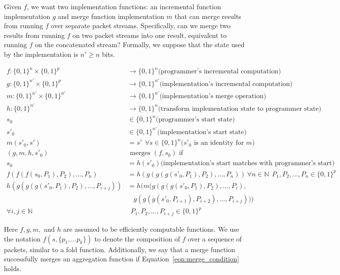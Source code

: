 Given $f$, we want two implementation functions: an incremental function implementation $g$
 and merge function implementation $m$ that can merge results from
running $f$ over separate packet streams. Specifically, can we merge
two results from running $f$ on two packet streams into one result,
equivalent to running $f$ on the concatenated stream? Formally, we suppose that the state used by
the implementation is $n' \geq n$ bits.

\begin{align}
f : \{0, 1\}^n \times \{0, 1\}^p & \rightarrow \{0, 1\}^n \mbox{(programmer's incremental computation)} \nonumber \\
g : \{0, 1\}^{n'} \times \{0, 1\}^p  & \rightarrow \{0, 1\}^{n'} \mbox{(implementation's incremental computation)} \nonumber \\
m : \{0, 1\}^{n'} \times \{0, 1\}^{n'} & \rightarrow \{0, 1\}^{n'} \mbox{(implementation's merge operation)} \nonumber \\
h : \{0, 1\}^{n'}               & \rightarrow \{0, 1\}^n  \mbox{(transform
 implementation state to programmer state)} \nonumber \\
s_0  & \in \{0, 1\}^n \mbox{(programmer's start state)} \nonumber \\
s'_0 & \in \{0, 1\}^{n'} \mbox{(implementation's start state)} \nonumber \\
m(s'_0, s') & = s' \ \ \forall s \in \{0, 1\}^{n} \mbox{($s'_0$ is an identity for $m$)} \nonumber \\
(g, m, h, s'_0) & \mbox { merges } (f, s_0) \mbox{ if} \nonumber \\
s_0 & = h(s'_0) \mbox{(implementation's start matches with programmer's start)} \label{eqn:start_condition} \\
f(f(f(s_0, P_1), P_2), \dots, P_n) & = h(g(g(g(s'_0, P_1), P_2), \dots, P_n)) \ \forall n \in \mathbb{N} \ \ P_1, P_2, \dots, P_n \in \{0, 1\}^p \label{eqn:projection_condition} \\
h(g(g(g(s'_0, P_1), P_2), \dots, P_{i+j})) & =h( m(g(g(g(s'_0, P_1), P_2), \dots, P_{i}), \nonumber \\
&\ \ \ \ g(g(g(s'_0, P_{i+1}), P_{i+2}), \dots, P_{i+j}))) \nonumber \\
\forall i, j \in \mathbb{N} & \ \  P_1, P_2, \dots, P_{i+j} \in \{0, 1\}^p \label{eqn:merge_condition}
\end{align}

Here $f, g, m,$ and $h$ are assumed to be efficiently computable functions. We use the notation $f(s, \{p_1, \ldots p_k\})$ to denote the composition of $f$ over a sequence
of packets, similar to a fold function. Additionally, we say that a merge function successfully merges an aggregation function if Equation~\ref{eqn:merge_condition} holds. 

